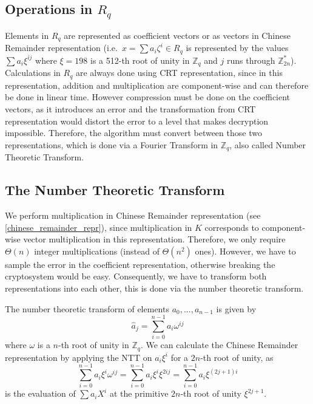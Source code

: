 \documentclass{report}
\newcommand{\Z}{\mathbb{Z}}
\begin{document}
\subsection{Operations in $R_q$}
Elements in $R_q$ are represented as coefficient vectors or as vectors in Chinese Remainder representation (i.e.\ $x = \sum a_i \zeta^i \in R_q$ is represented by the values $\sum a_i \xi^{ij}$ where $\xi = 198$ is a 512-th root of unity in $\Z_q$ and $j$ runs through $\Z_{2n}^*$). Calculations in $R_q$ are always done using CRT representation, since in this representation, addition and multiplication are component-wise and can therefore be done in linear time. However compression must be done on the coefficient vectors, as it introduces an error and the transformation from CRT representation would distort the error to a level that makes decryption impossible. Therefore, the algorithm must convert between those two representations, which is done via a Fourier Transform in $\Z_q$, also called Number Theoretic Transform.

\subsection{The Number Theoretic Transform}
We perform multiplication in Chinese Remainder representation (see \ref{chinese_remainder_repr}), since multiplication in $K$ corresponds to component-wise vector multiplication in this representation. Therefore, we only require $\Theta(n)$ integer multiplications (instead of $\Theta(n^2)$ ones). However, we have to sample the error in the coefficient representation, otherwise breaking the cryptosystem would be easy. Consequently, we have to transform both representations into each other, this is done via the number theoretic transform.

The number theoretic transform of elements $a_0, ..., a_{n - 1}$ is given by
\begin{equation}
\hat{a}_j = \sum_{i = 0}^{n - 1} a_i \omega^{ij} \nonumber
\end{equation}
where $\omega$ is a $n$-th root of unity in $\Z_q$. We can calculate the Chinese Remainder representation by applying the NTT on $a_i \xi^i$ for a $2n$-th root of unity, as
\begin{equation}
\sum_{i = 0}^{n - 1} a_i \xi^i \omega^{ij} = \sum_{i = 0}^{n - 1} a_i \xi^i \xi^{2ij} = \sum_{i = 0}^{n - 1} a_i \xi^{(2j + 1) i} \nonumber
\end{equation}
is the evaluation of $\sum a_i X^i$ at the primitive $2n$-th root of unity $\xi^{2j + 1}$.
\end{document}
